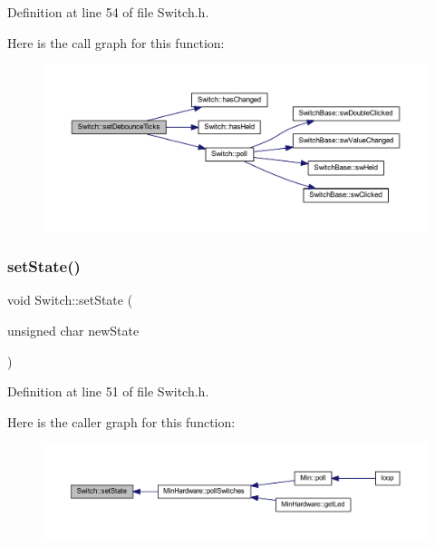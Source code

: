 Definition at line 54 of file Switch.\+h.

Here is the call graph for this function\+:
\nopagebreak
\begin{figure}[H]
\begin{center}
\leavevmode
\includegraphics[width=350pt]{class_switch_ad1991a92a3b5c470d667a5e26c59ef59_cgraph}
\end{center}
\end{figure}
\mbox{\label{class_switch_a29ddb1bfd9284e52b4adb0063d69371c}} 
\subsubsection{\texorpdfstring{set\+State()}{setState()}}
{\footnotesize\ttfamily void Switch\+::set\+State (\begin{DoxyParamCaption}\item[{unsigned char}]{new\+State }\end{DoxyParamCaption})\hspace{0.3cm}{\ttfamily [inline]}}



Definition at line 51 of file Switch.\+h.

Here is the caller graph for this function\+:
\nopagebreak
\begin{figure}[H]
\begin{center}
\leavevmode
\includegraphics[width=350pt]{class_switch_a29ddb1bfd9284e52b4adb0063d69371c_icgraph}
\end{center}
\end{figure}
\mbox{\label{class_switch_af4d055387cb6f0a2278db5f0b4f01ede}} 
